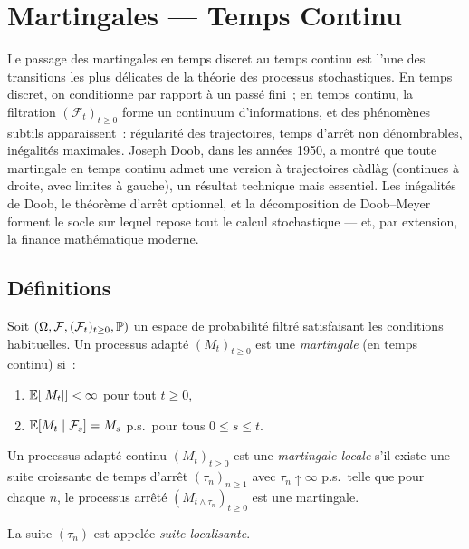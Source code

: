 \chapter{Martingales --- Temps Continu}
\label{ch:martingales_continu}

Le passage des martingales en temps discret au temps continu est l'une des transitions les plus d\'elicates de la th\'eorie des processus stochastiques. En temps discret, on conditionne par rapport \`a un pass\'e fini~; en temps continu, la filtration $(\mathcal{F}_t)_{t \geq 0}$ forme un continuum d'informations, et des ph\'enom\`enes subtils apparaissent~: r\'egularit\'e des trajectoires, temps d'arr\^et non d\'enombrables, in\'egalit\'es maximales. Joseph Doob, dans les ann\'ees 1950, a montr\'e que toute martingale en temps continu admet une version \`a trajectoires c\`adl\`ag (continues \`a droite, avec limites \`a gauche), un r\'esultat technique mais essentiel. Les in\'egalit\'es de Doob, le th\'eor\`eme d'arr\^et optionnel, et la d\'ecomposition de Doob--Meyer forment le socle sur lequel repose tout le calcul stochastique --- et, par extension, la finance math\'ematique moderne.

\section{D\'efinitions}

\begin{definition}
Soit $(\Omega, \mathcal{F}, (\mathcal{F}_t)_{t \geq 0}, \mathbb{P})$ un espace de
probabilit\'e filtr\'e satisfaisant les conditions habituelles. Un processus
adapt\'e $(M_t)_{t \geq 0}$ est une \emph{martingale} (en temps continu) si~:
\begin{enumerate}
  \item $\mathbb{E}[\left| M_t \right|] < \infty$ pour tout $t \geq 0$,
  \item $\mathbb{E}[M_t \mid \mathcal{F}_s] = M_s$ p.s.\ pour tous $0 \leq s \leq t$.
\end{enumerate}
\end{definition}

\begin{definition}
Un processus adapt\'e continu $(M_t)_{t \geq 0}$ est une \emph{martingale locale}
s'il existe une suite croissante de temps d'arr\^et $(\tau_n)_{n \geq 1}$ avec
$\tau_n \uparrow \infty$ p.s.\ telle que pour chaque $n$, le processus arr\^et\'e
$(M_{t \wedge \tau_n})_{t \geq 0}$ est une martingale.

La suite $(\tau_n)$ est appel\'ee \emph{suite localisante}.
\end{definition}

